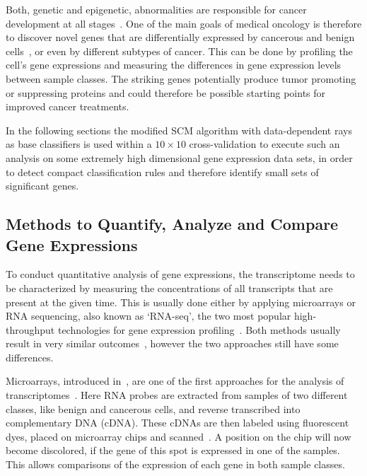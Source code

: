 Both, genetic and epigenetic, abnormalities are responsible for cancer development at all stages~\citep{jones, jaenisch}. %
One of the main goals of medical oncology is therefore to discover novel genes that are differentially expressed by cancerous and benign cells~\citep{guo13},
or even by different subtypes of cancer.
This can be done by profiling the cell's gene expressions and measuring the differences in gene expression levels between sample classes.
The striking genes potentially produce tumor promoting or suppressing proteins and could therefore be possible starting points for improved cancer treatments.

In the following sections the modified SCM algorithm with data-dependent rays as 
base classifiers is used within a \(10 \times 10\) cross-validation to execute such an analysis on some
extremely high dimensional gene expression data sets, in order to detect compact classification
rules and therefore identify small sets of significant genes.


\subsection{Methods to Quantify, Analyze and Compare Gene Expressions}

To conduct quantitative analysis of gene expressions, the transcriptome needs to be characterized
by measuring the concentrations of all transcripts that are present at the given time.
This is usually done either by applying microarrays or RNA sequencing, also known as `RNA-seq',
the two most popular high-throughput technologies for gene expression profiling~\citep{li09,guo13}.
Both methods usually result in very similar outcomes~\citep{guo13}, however the two approaches
still have some differences.

Microarrays, introduced in~\cite{schena}, are one of the first approaches for the analysis of transcriptomes~\citep{malone}.
Here RNA probes are extracted from samples of two different classes, like benign and cancerous cells, and reverse transcribed into complementary DNA (cDNA).
These cDNAs are then labeled using fluorescent dyes, placed on microarray chips and scanned~\citep{malone}.
A position on the chip will now become discolored, if the gene of this spot is expressed in one of the samples.
This allows comparisons of the expression of each gene in both sample classes.

